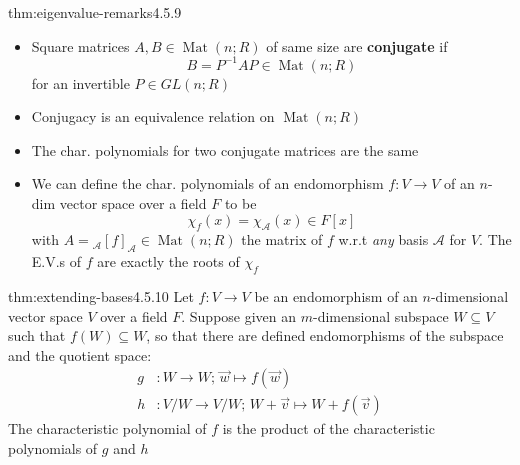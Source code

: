 \documentclass[landscape, 8pt]{extarticle}
\DeclareMathOperator{\Mat}{Mat}
\begin{document}
\begin{multicols}{3}
\begin{thm}{thm:eigenvalue-remarks}{4.5.9}
    \begin{itemize}[leftmargin=*]
        \setlength\itemsep{0em}
        \item Square matrices $A, B\in \Mat(n;R)$ of same size are \textbf{conjugate} if
            \[B = P^{-1}AP\in \Mat(n; R)\]
            for an invertible $P\in GL(n;R)$
        \item Conjugacy is an equivalence relation on $\Mat(n;R)$
        \item The char. polynomials for two conjugate matrices are the same
        \item We can define the char. polynomials of an endomorphism $f : V\to V$ of an $n$-dim vector space over a field $F$ to be
            \[\chi_{f}(x) = \chi_{\mathcal{A}}(x)\in F[x]\]
            with $A = {}_{\mathcal{A}}[f]_{\mathcal{A}}\in \Mat(n;R)$ the matrix of $f$ w.r.t \textit{any} basis $\mathcal{A}$ for $V$. The E.V.s of $f$ are exactly the roots of $\chi_{f}$
    \end{itemize}
\end{thm}

\begin{thm}{thm:extending-bases}{4.5.10}
    Let $f : V\to V$ be an endomorphism of an $n$-dimensional vector space $V$ over a field $F$. Suppose given an $m$-dimensional subspace $W\subseteq V$ such that $f(W)\subseteq W$, so that there are defined endomorphisms of the subspace and the quotient space:
    \begin{align*}
        g &: W \to W;\, \vec{w}\mapsto f(\vec{w})\\
        h &: V / W \to V / W;\, W + \vec{v} \mapsto W + f(\vec{v})
    \end{align*}
    The characteristic polynomial of $f$ is the product of the characteristic polynomials of $g$ and $h$
\end{thm}


\end{multicols}
\end{document}
